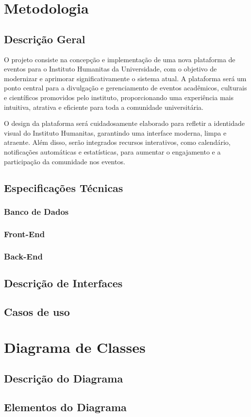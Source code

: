 \chapter{Metodologia}


\section{Descrição Geral}

O projeto consiste na concepção e implementação de uma nova plataforma de eventos para o Instituto Humanitas da Universidade, com o objetivo de modernizar e aprimorar significativamente o sistema atual. A plataforma será um ponto central para a divulgação e gerenciamento de eventos acadêmicos, culturais e científicos promovidos pelo instituto, proporcionando uma experiência mais intuitiva, atrativa e eficiente para toda a comunidade universitária.

O design da plataforma será cuidadosamente elaborado para refletir a identidade visual do Instituto Humanitas, garantindo uma interface moderna, limpa e atraente. Além disso, serão integrados recursos interativos, como calendário, notificações automáticas e estatísticas, para aumentar o engajamento e a participação da comunidade nos eventos.


\section{Especificações Técnicas}

\subsection{Banco de Dados}


\subsection{Front-End}


\subsection{Back-End}


\section{Descrição de Interfaces}


\section{Casos de uso}


\chapter{Diagrama de Classes}


\section{Descrição do Diagrama}


\section{Elementos do Diagrama}
